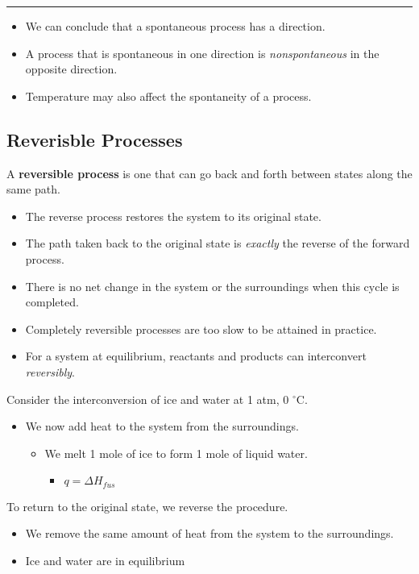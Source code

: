 \documentclass[10pt]{article}
\begin{document}
\noindent\rule{6.5in}{0.4pt}

\begin{itemize}
    \item We can conclude that a spontaneous process has a direction.
    \item A process that is spontaneous in one direction is \textit{nonspontaneous} in the opposite direction.
    \item Temperature may also affect the spontaneity of a process.
\end{itemize}

\subsection*{Reverisble Processes}
A \textbf{reversible process} is one that can go back and forth between states along the same path.
\begin{itemize}
    \item The reverse process restores the system to its original state.
    \item The path taken back to the original state is \textit{exactly} the reverse of the forward process.
    \item There is no net change in the system or the surroundings when this cycle is completed.
    \item Completely reversible processes are too slow to be attained in practice.
    \item For a system at equilibrium, reactants and products can interconvert \textit{reversibly}.
\end{itemize}
Consider the interconversion of ice and water at 1 atm, 0 $^\circ$C.
\begin{itemize}
    \item We now add heat to the system from the surroundings.
    \begin{itemize}
        \item We melt 1 mole of ice to form 1 mole of liquid water.
        \begin{itemize}
            \item $q = \Delta H_{fus}$
        \end{itemize}
    \end{itemize}
\end{itemize}
To return to the original state, we reverse the procedure.
\begin{itemize}
    \item We remove the same amount of heat from the system to the surroundings.
    \item Ice and water are in equilibrium
\end{itemize}
\end{document}
